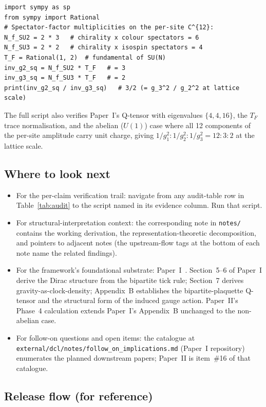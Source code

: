 {\scriptsize
\begin{verbatim}
import sympy as sp
from sympy import Rational
# Spectator-factor multiplicities on the per-site C^{12}:
N_f_SU2 = 2 * 3   # chirality x colour spectators = 6
N_f_SU3 = 2 * 2   # chirality x isospin spectators = 4
T_F = Rational(1, 2)  # fundamental of SU(N)
inv_g2_sq = N_f_SU2 * T_F   # = 3
inv_g3_sq = N_f_SU3 * T_F   # = 2
print(inv_g2_sq / inv_g3_sq)   # 3/2 (= g_3^2 / g_2^2 at lattice scale)
\end{verbatim}
}

The full script also verifies Paper~I's Q-tensor with eigenvalues
$\{4, 4, 16\}$, the $T_F$ trace normalisation, and the abelian
($U(1)$) case where all 12 components of the per-site amplitude
carry unit charge, giving $1/g_1^2 : 1/g_2^2 : 1/g_3^2 = 12 : 3 : 2$
at the lattice scale.

\subsection{Where to look next}
\label{subsec:repro_pointers}

\begin{itemize}
\item For the per-claim verification trail: navigate from any
  audit-table row in Table~\ref{tab:audit} to the script named in
  its evidence column.  Run that script.
\item For structural-interpretation context: the corresponding
  note in \nolinkurl{notes/} contains the working derivation, the
  representation-theoretic decomposition, and pointers to adjacent
  notes (the upstream-flow tags at the bottom of each note name
  the related findings).
\item For the framework's foundational substrate:
  Paper~I~\cite{menendez2026geometry}.  Section~5--6 of Paper~I
  derive the Dirac structure from the bipartite tick rule;
  Section~7 derives gravity-as-clock-density; Appendix~B
  establishes the bipartite-plaquette Q-tensor and the
  structural form of the induced gauge action.  Paper~II's
  Phase~4 calculation extends Paper~I's Appendix~B unchanged to
  the non-abelian case.
\item For follow-on questions and open items: the catalogue at
  \nolinkurl{external/dcl/notes/follow_on_implications.md}
  (Paper~I repository) enumerates the planned downstream papers;
  Paper~II is item~\#16 of that catalogue.
\end{itemize}

\subsection{Release flow (for reference)}
\label{subsec:repro_release_flow}

